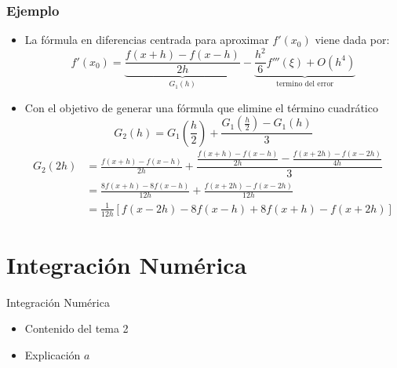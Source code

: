 \documentclass[12pt]{beamer}
\begin{document}
\frame
{
\frametitle{Ejemplo}
\begin{itemize}
  \item La f\'ormula en diferencias centrada para aproximar $f'(x_0)$ viene dada por:
  {\small
  $$
  f'(x_0) = \underbrace{\dfrac{f(x+h)-f(x-h)}{2h}}_{G_1(h)}-\underbrace{\dfrac{h^2}{6}f'''(\xi)+O(h^4)}_{\text{termino del error}}  
  $$}
  \item<2-> Con el objetivo de generar una f\'ormula que elimine el t\'ermino cuadr\'atico
  {\small
  $$
  G_2(h) = G_1\left(\frac{h}{2}\right) + \dfrac{G_1\left(\frac{h}{2}\right)-G_1(h)}{3}  
  $$
  \begin{align*}
    G_2(2h) & = \frac{f(x+h)-f(x-h)}{2h}+\dfrac{\frac{f(x+h)-f(x-h)}{2h}-\frac{f(x+2h)-f(x-2h)}{4h}}{3}\\
    & = \frac{8f(x+h)-8f(x-h)}{12h}+\frac{f(x+2h)-f(x-2h)}{12h}\\
    & = \frac{1}{12h}\left[f(x-2h)-8f(x-h)+8f(x+h)-f(x+2h)\right]  
  \end{align*}}
\end{itemize}
}  
\section{Integraci\'on Num\'erica}
\begin{frame}{Integraci\'on Num\'erica}
    \begin{itemize}
        \item Contenido del tema 2
        \item Explicación $a$
    \end{itemize}
\end{frame}
\end{document}
